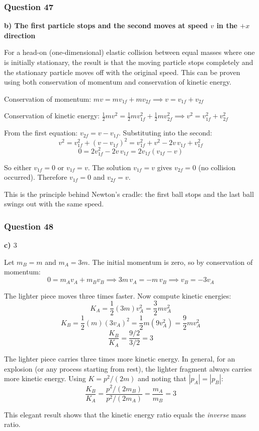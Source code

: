 \documentclass[12pt,letterpaper]{article}
\begin{document}
\subsubsection*{Question 47}

\begin{answerbox}
\textbf{b) The first particle stops and the second moves at speed $v$ in the $+x$ direction}
\end{answerbox}

\begin{explanationbox}
For a head-on (one-dimensional) elastic collision between equal masses where one is initially stationary, the result is that the moving particle stops completely and the stationary particle moves off with the original speed. This can be proven using both conservation of momentum and conservation of kinetic energy.

Conservation of momentum: $mv = mv_{1f} + mv_{2f} \implies v = v_{1f} + v_{2f}$

Conservation of kinetic energy: $\frac{1}{2}mv^2 = \frac{1}{2}mv_{1f}^2 + \frac{1}{2}mv_{2f}^2 \implies v^2 = v_{1f}^2 + v_{2f}^2$

From the first equation: $v_{2f} = v - v_{1f}$. Substituting into the second:
\[
v^2 = v_{1f}^2 + (v - v_{1f})^2 = v_{1f}^2 + v^2 - 2v\,v_{1f} + v_{1f}^2
\]
\[
0 = 2v_{1f}^2 - 2v\,v_{1f} = 2v_{1f}(v_{1f} - v)
\]

So either $v_{1f} = 0$ or $v_{1f} = v$. The solution $v_{1f} = v$ gives $v_{2f} = 0$ (no collision occurred). Therefore $v_{1f} = 0$ and $v_{2f} = v$.

This is the principle behind Newton's cradle: the first ball stops and the last ball swings out with the same speed.
\end{explanationbox}

\subsubsection*{Question 48}

\begin{answerbox}
\textbf{c) $3$}
\end{answerbox}

\begin{explanationbox}
Let $m_B = m$ and $m_A = 3m$. The initial momentum is zero, so by conservation of momentum:
\[
0 = m_A v_A + m_B v_B \implies 3m\,v_A = -m\,v_B \implies v_B = -3v_A
\]

The lighter piece moves three times faster. Now compute kinetic energies:
\[
K_A = \frac{1}{2}(3m)v_A^2 = \frac{3}{2}mv_A^2
\]
\[
K_B = \frac{1}{2}(m)(3v_A)^2 = \frac{1}{2}m(9v_A^2) = \frac{9}{2}mv_A^2
\]
\[
\frac{K_B}{K_A} = \frac{9/2}{3/2} = 3
\]

The lighter piece carries three times more kinetic energy. In general, for an explosion (or any process starting from rest), the lighter fragment always carries more kinetic energy. Using $K = p^2/(2m)$ and noting that $|p_A| = |p_B|$:
\[
\frac{K_B}{K_A} = \frac{p^2/(2m_B)}{p^2/(2m_A)} = \frac{m_A}{m_B} = 3
\]

This elegant result shows that the kinetic energy ratio equals the \emph{inverse} mass ratio.
\end{explanationbox}
\end{document}
